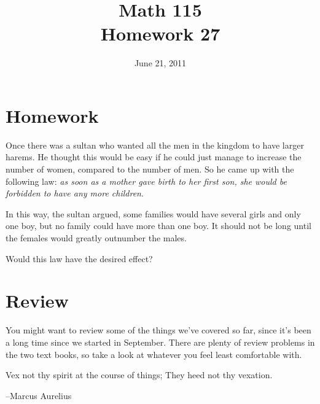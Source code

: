 \documentclass[fleqn,addpoints]{exam}
\title{Math 115 \\ Homework 27}
\date{June 21, 2011}
\begin{document}
\maketitle



\ifprintanswers
\else

\section{Homework}

Once there was a sultan who wanted all the men in the kingdom to have larger harems.  He thought this would be easy if
he could just manage to increase the number of women, compared to the number of men.  So he came up with the following
law: {\em as soon as a mother gave birth to her first son, she would be forbidden to have any more children}.

In this way, the sultan argued, some families would have several girls and only one boy, but no family could have more
than one boy.  It should not be long until the females would greatly outnumber the males.

Would this law have the desired effect?

\section{Review}

You might want to review some of the things we've covered so far, since it's been a long time since we started in
September.  There are plenty of review problems in the two text books, so take a
look at whatever you feel least comfortable with. 

\vspace{3.5 in}

\begin{em}
Vex not thy spirit at the course of things;  They heed not thy vexation.
\end{em}

\vspace{.2 cm}
\hspace{1.5 cm} --Marcus Aurelius

\fi
\end{document}
